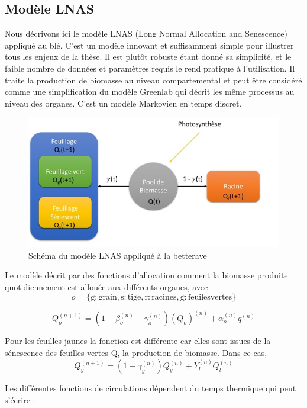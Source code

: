 \subsection{Modèle LNAS}
Nous décrivons ici le modèle LNAS (Long Normal Allocation and Senescence) appliqué au blé. C’est un modèle innovant et suffisamment simple pour illustrer tous les enjeux de la thèse. Il est plutôt robuste étant donné sa simplicité, et le faible nombre de données et paramètres requis le rend pratique à l’utilisation. Il traite la production de biomasse au niveau compartemental et peut être considéré comme une simplification du modèle Greenlab qui décrit les même processus au niveau des organes.
C’est un modèle Markovien en temps discret.

\begin{figure}[h]
	\begin{center}
	
	
  \includegraphics[scale=1.0]{./img/sBeetRoot.jpg}
  \caption{Schéma du modèle LNAS appliqué à la betterave}
  \label{fig:sBeetRoot}
  
  \end{center}
\end{figure}

Le modèle décrit par des fonctions d'allocation comment la biomasse produite quotidiennement est allouée aux différents organes, avec 
\[ o = \{\mathrm{g:grain, s:tige, r:racines, g:feuiles vertes}\} \]

\[ {Q_o^{(n+1)}} = (1-\beta_o^{(n)}-\gamma_o^{(n)} )(Q_o)^{(n)} +\alpha_o^{(n)}q^{(n)} \]

Pour les feuilles jaunes la fonction est différente car elles sont issues de la sénescence des feuilles vertes Q, la production de biomasse. 
Dans ce cas, 
\[ {Q_y^{(n+1)}}=(1-\gamma_y^{(n)})Q_y^{(n)}+Y_l^{(n)}Q_l^{(n)} \]

Les différentes fonctions de circulations dépendent du temps thermique qui peut s'écrire :

